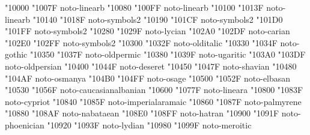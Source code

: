 \documentclass{article}
\begin{document}
                             { "10000} { "1007F} {noto-linearb}
                             { "10080} { "100FF} {noto-linearb}
                                 { "10100} { "1013F} {noto-linearb}
                          { "10140} { "1018F} {noto-symbols2}
                                { "10190} { "101CF} {noto-symbols2}
                                  { "101D0} { "101FF} {noto-symbols2}
                                         { "10280} { "1029F} {noto-lycian}
                                         { "102A0} { "102DF} {noto-carian}
                           { "102E0} { "102FF} {noto-symbols2}
                                     { "10300} { "1032F} {noto-olditalic}
                                         { "10330} { "1034F} {noto-gothic}
                                     { "10350} { "1037F} {noto-oldpermic}
                                       { "10380} { "1039F} {noto-ugaritic}
                                    { "103A0} { "103DF} {noto-oldpersian}
                                        { "10400} { "1044F} {noto-deseret}
                                        { "10450} { "1047F} {noto-shavian}
                                        { "10480} { "104AF} {noto-osmanya}
                                          { "104B0} { "104FF} {noto-osage}
                                        { "10500} { "1052F} {noto-elbasan}
                             { "10530} { "1056F} {noto-caucasianalbanian}
                                       { "10600} { "1077F} {noto-lineara}
                              { "10800} { "1083F} {noto-cypriot}
                               { "10840} { "1085F} {noto-imperialaramaic}
                                      { "10860} { "1087F} {noto-palmyrene}
                                      { "10880} { "108AF} {noto-nabataean}
                                         { "108E0} { "108FF} {noto-hatran}
                                     { "10900} { "1091F} {noto-phoenician}
                                         { "10920} { "1093F} {noto-lydian}
                           { "10980} { "1099F} {noto-meroitic}
\end{document}
